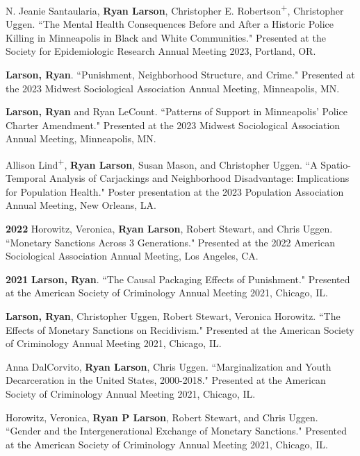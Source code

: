 \documentclass[letterpaper]{article}
\newenvironment{publist}{%
  \begin{list}{}{%
    \setlength{\leftmargin}{0cm}   %
    \setlength{\labelwidth}{2cm}     %
    \setlength{\labelsep}{0.5cm}     %
  }%
}{%
  \end{list}%
}
\begin{document}
\begin{publist}
\item N. Jeanie Santaularia, \textbf{Ryan Larson}, Christopher E. Robertson\textsuperscript{+}, Christopher Uggen. ``The Mental Health Consequences Before and After a Historic Police Killing in Minneapolis in Black and White Communities." Presented at the Society for Epidemiologic Research Annual Meeting 2023, Portland, OR.

\item \textbf{Larson, Ryan}. ``Punishment, Neighborhood Structure, and Crime." Presented at the 2023 Midwest Sociological Association Annual Meeting, Minneapolis, MN. 

\item \textbf{Larson, Ryan} and Ryan LeCount. ``Patterns of Support in Minneapolis’ Police Charter Amendment." Presented at the 2023 Midwest Sociological Association Annual Meeting, Minneapolis, MN. 

\item Allison Lind\textsuperscript{+}, \textbf{Ryan Larson}, Susan Mason, and Christopher Uggen. ``A Spatio-Temporal Analysis of Carjackings and Neighborhood Disadvantage: Implications for Population Health." Poster presentation at the 2023 Population Association Annual Meeting, New Orleans, LA. 

\item[\textbf{2022}] Horowitz, Veronica, \textbf{Ryan Larson}, Robert Stewart, and Chris Uggen. ``Monetary Sanctions Across 3 Generations." Presented at the 2022 American Sociological Association Annual Meeting, Los Angeles, CA. 

\item[\textbf{2021}] \textbf{Larson, Ryan}. ``The Causal Packaging Effects of Punishment." Presented at the American Society of Criminology Annual Meeting 2021, Chicago, IL. 

\item \textbf{Larson, Ryan}, Christopher Uggen, Robert Stewart, Veronica Horowitz. ``The Effects of Monetary Sanctions on Recidivism." Presented at the American Society of Criminology Annual Meeting 2021, Chicago, IL. 

\item Anna DalCorvito, \textbf{Ryan Larson}, Chris Uggen. ``Marginalization and Youth Decarceration in the United States, 2000-2018." Presented at the American Society of Criminology Annual Meeting 2021, Chicago, IL. 

\item Horowitz, Veronica, \textbf{Ryan P Larson}, Robert Stewart, and Chris Uggen. ``Gender and the Intergenerational Exchange of Monetary Sanctions." Presented at the American Society of Criminology Annual Meeting 2021, Chicago, IL. 


\end{publist}
\end{document}
